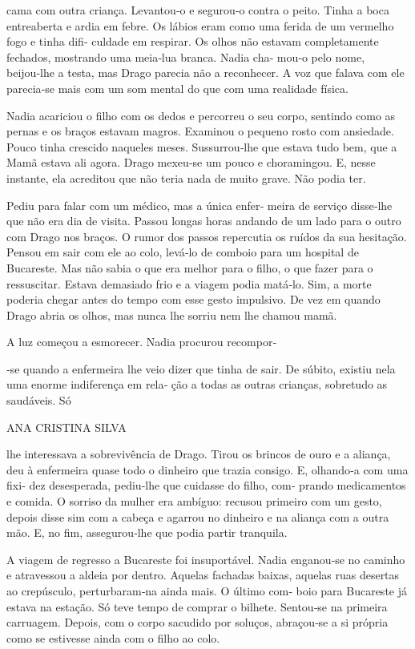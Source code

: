 cama com outra criança. Levantou‑o e segurou‑o contra o peito. Tinha a
boca entreaberta e ardia em febre. Os lábios eram como uma ferida de um
vermelho fogo e tinha difi‑ culdade em respirar. Os olhos não estavam
completamente fechados, mostrando uma meia‑lua branca. Nadia cha‑ mou‑o
pelo nome, beijou‑lhe a testa, mas Drago parecia não a reconhecer. A voz
que falava com ele parecia‑se mais com um som mental do que com uma
realidade física.

Nadia acariciou o filho com os dedos e percorreu o seu corpo, sentindo
como as pernas e os braços estavam magros. Examinou o pequeno rosto com
ansiedade. Pouco tinha crescido naqueles meses. Sussurrou‑lhe que estava
tudo bem, que a Mamã estava ali agora. Drago mexeu‑se um pouco e
choramingou. E, nesse instante, ela acreditou que não teria nada de
muito grave. Não podia ter.

Pediu para falar com um médico, mas a única enfer‑ meira de serviço
disse‑lhe que não era dia de visita. Passou longas horas andando de um
lado para o outro com Drago nos braços. O rumor dos passos repercutia os
ruídos da sua hesitação. Pensou em sair com ele ao colo, levá‑lo de
comboio para um hospital de Bucareste. Mas não sabia o que era melhor
para o filho, o que fazer para o ressuscitar. Estava demasiado frio e a
viagem podia matá‑lo. Sim, a morte poderia chegar antes do tempo com
esse gesto impulsivo. De vez em quando Drago abria os olhos, mas nunca
lhe sorriu nem lhe chamou mamã.

A luz começou a esmorecer. Nadia procurou recompor‑

‑se quando a enfermeira lhe veio dizer que tinha de sair. De súbito,
existiu nela uma enorme indiferença em rela‑ ção a todas as outras
crianças, sobretudo as saudáveis. Só

ANA CRISTINA SILVA

lhe interessava a sobrevivência de Drago. Tirou os brincos de ouro e a
aliança, deu à enfermeira quase todo o dinheiro que trazia consigo. E,
olhando‑a com uma fixi‑ dez desesperada, pediu‑lhe que cuidasse do
filho, com‑ prando medicamentos e comida. O sorriso da mulher era
ambíguo: recusou primeiro com um gesto, depois disse sim com a cabeça e
agarrou no dinheiro e na aliança com a outra mão. E, no fim,
assegurou‑lhe que podia partir tranquila.

A viagem de regresso a Bucareste foi insuportável. Nadia enganou‑se no
caminho e atravessou a aldeia por dentro. Aquelas fachadas baixas,
aquelas ruas desertas ao crepúsculo, perturbaram‑na ainda mais. O último
com‑ boio para Bucareste já estava na estação. Só teve tempo de comprar
o bilhete. Sentou‑se na primeira carruagem. Depois, com o corpo sacudido
por soluços, abraçou‑se a si própria como se estivesse ainda com o filho
ao colo.

